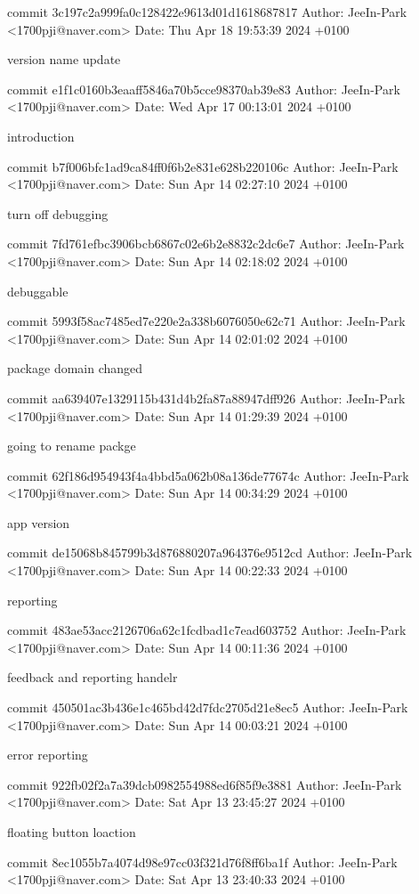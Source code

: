 commit 3c197c2a999fa0c128422e9613d01d1618687817
Author: JeeIn-Park <1700pji@naver.com>
Date:   Thu Apr 18 19:53:39 2024 +0100

    version name update

commit e1f1c0160b3eaaff5846a70b5cce98370ab39e83
Author: JeeIn-Park <1700pji@naver.com>
Date:   Wed Apr 17 00:13:01 2024 +0100

    introduction

commit b7f006bfc1ad9ca84ff0f6b2e831e628b220106c
Author: JeeIn-Park <1700pji@naver.com>
Date:   Sun Apr 14 02:27:10 2024 +0100

    turn off debugging

commit 7fd761efbc3906bcb6867c02e6b2e8832c2dc6e7
Author: JeeIn-Park <1700pji@naver.com>
Date:   Sun Apr 14 02:18:02 2024 +0100

    debuggable

commit 5993f58ac7485ed7e220e2a338b6076050e62c71
Author: JeeIn-Park <1700pji@naver.com>
Date:   Sun Apr 14 02:01:02 2024 +0100

    package domain changed

commit aa639407e1329115b431d4b2fa87a88947dff926
Author: JeeIn-Park <1700pji@naver.com>
Date:   Sun Apr 14 01:29:39 2024 +0100

    going to rename packge

commit 62f186d954943f4a4bbd5a062b08a136de77674c
Author: JeeIn-Park <1700pji@naver.com>
Date:   Sun Apr 14 00:34:29 2024 +0100

    app version

commit de15068b845799b3d876880207a964376e9512cd
Author: JeeIn-Park <1700pji@naver.com>
Date:   Sun Apr 14 00:22:33 2024 +0100

    reporting

commit 483ae53acc2126706a62c1fcdbad1c7ead603752
Author: JeeIn-Park <1700pji@naver.com>
Date:   Sun Apr 14 00:11:36 2024 +0100

    feedback and reporting handelr

commit 450501ac3b436e1c465bd42d7fdc2705d21e8ec5
Author: JeeIn-Park <1700pji@naver.com>
Date:   Sun Apr 14 00:03:21 2024 +0100

    error reporting

commit 922fb02f2a7a39dcb0982554988ed6f85f9e3881
Author: JeeIn-Park <1700pji@naver.com>
Date:   Sat Apr 13 23:45:27 2024 +0100

    floating button loaction

commit 8ec1055b7a4074d98e97cc03f321d76f8ff6ba1f
Author: JeeIn-Park <1700pji@naver.com>
Date:   Sat Apr 13 23:40:33 2024 +0100


